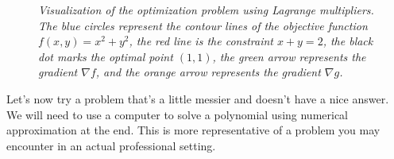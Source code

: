 \begin{example}
\begin{solution}
\begin{enumerate}
\begin{figure}[H]
        \caption{\textit{Visualization of the optimization problem using Lagrange multipliers. The blue circles represent the contour lines of the objective function \( f(x, y) = x^2 + y^2 \), the red line is the constraint \( x + y = 2 \), the black dot marks the optimal point \( (1, 1) \), the green arrow represents the gradient \( \nabla f \), and the orange arrow represents the gradient \( \nabla g \).}}
        \label{fig:lagrange_multiplier_plot_example}
    \end{figure}
    
\end{enumerate}
\end{solution}
\end{example}

\exampleline


\noindent Let's now try a problem that's a little messier and doesn't have a nice answer. We will need to use a computer to solve a polynomial using numerical approximation at the end. This is more representative of a problem you may encounter in an actual professional setting.


